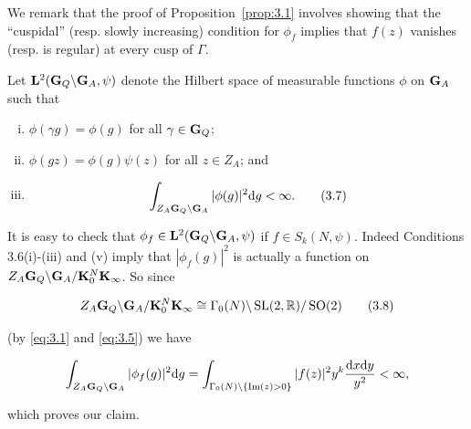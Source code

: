 We remark that the proof of Proposition~\ref{prop:3.1} involves showing that the ``cuspidal'' (resp. slowly increasing) condition for $\phi_f$ implies that $f(z)$ vanishes (resp. is regular) at every cusp of $\Gamma$.

\begin{definition}\label{def:3.2}

Let $\mathbf{L}^2(\mathbf{G}_Q\backslash\mathbf{G}_A,\psi)$ denote the Hilbert space of measurable functions $\phi$ on $\mathbf{G}_A$ such that

\begin{enumerate}[(i)]

\item $\phi(\gamma g) = \phi(g)$ for all $\gamma \in \mathbf{G}_Q$;

\item $\phi(gz) = \phi(g)\psi(z)$ for all $z \in Z_A$; and

\item

\begin{equation}\label{eq:3.7}
\int_{Z_A\mathbf{G}_Q\backslash\mathbf{G}_A}|\phi(g)|^2\mathrm{d} g < \infty.\tag{3.7}
\end{equation}

\end{enumerate}

\end{definition}

It is easy to check that $\phi_f \in \mathbf{L}^2(\mathbf{G}_Q\backslash\mathbf{G}_A,\psi)$ if $f \in S_k(N,\psi)$. Indeed Conditions 3.6(i)-(iii) and (v) imply that $|\phi_f(g)|^2$ is actually a function on $Z_A\mathbf{G}_Q\backslash\mathbf{G}_A/\mathbf{K}_0^N\mathbf{K}_\infty$. So since

\begin{equation}\label{eq:3.8}
Z_A\mathbf{G}_Q\backslash\mathbf{G}_A/\mathbf{K}_0^N\mathbf{K}_\infty \cong \Gamma_0(N)\backslash\operatorname{SL}(2,\mathbb{R})/\operatorname{SO}(2)\tag{3.8}
\end{equation}

(by \eqref{eq:3.1} and \eqref{eq:3.5}) we have

\[
\int_{Z_A\mathbf{G}_Q\backslash\mathbf{G}_A}|\phi_f(g)|^2\mathrm{d} g = \int_{\Gamma_0(N)\backslash\{\operatorname{Im}(z) > 0\}}|f(z)|^2 y^k\frac{\mathrm{d} x\mathrm{d} y}{y^2} < \infty,
\]

which proves our claim.

